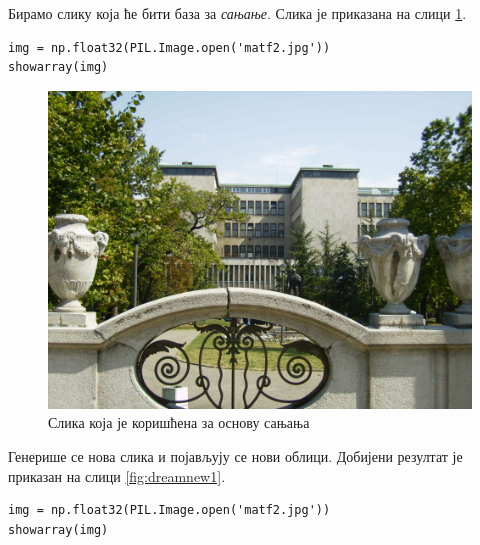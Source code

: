 \documentclass[a4paper]{article}
\begin{document}
Бирамо слику која ће бити база за \textit{сањање}.
Слика је приказана на слици \ref{fig:dreambase}.

\begin{verbatim}
img = np.float32(PIL.Image.open('matf2.jpg'))
showarray(img)
\end{verbatim}

\begin{figure}[h!]
\begin{center}
    \includegraphics[width=\textwidth]{./resources/dreambase.jpg}
\end{center}
\caption{Слика која је коришћена за основу сањања}
\label{fig:dreambase}
\end{figure}

Генерише се нова слика и појављују се нови облици. Добијени резултат
је приказан на слици \ref{fig:dreamnew1}.

\begin{verbatim}
img = np.float32(PIL.Image.open('matf2.jpg'))
showarray(img)
\end{verbatim}
\end{document}
